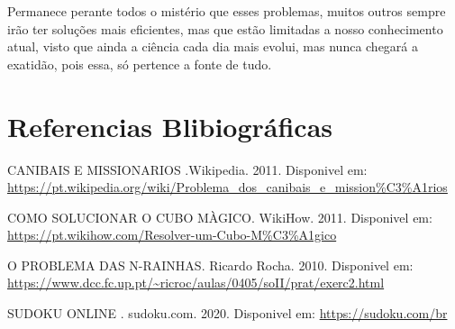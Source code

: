 \documentclass[12pt,a4paper,twocolumn]{article}
\begin{document}
Permanece perante todos o mistério que esses problemas, muitos outros sempre irão ter soluções mais eficientes, mas que estão limitadas a nosso conhecimento atual, visto que ainda a ciência cada dia mais evolui, mas nunca chegará a exatidão, pois essa, só pertence a fonte de tudo.  

\section{Referencias Blibiográficas}

CANIBAIS E MISSIONARIOS .Wikipedia. 2011. Disponivel em: 
\url{https://pt.wikipedia.org/wiki/Problema_dos_canibais_e_mission%C3%A1rios}



COMO SOLUCIONAR O CUBO MÀGICO. WikiHow. 2011. Disponivel em: 
\url{https://pt.wikihow.com/Resolver-um-Cubo-M%C3%A1gico}


O PROBLEMA DAS N-RAINHAS.  Ricardo Rocha. 2010. Disponivel em:
\url{https://www.dcc.fc.up.pt/~ricroc/aulas/0405/soII/prat/exerc2.html}


SUDOKU ONLINE . sudoku.com. 2020. Disponivel em:
\url{https://sudoku.com/br}


\end{document}
